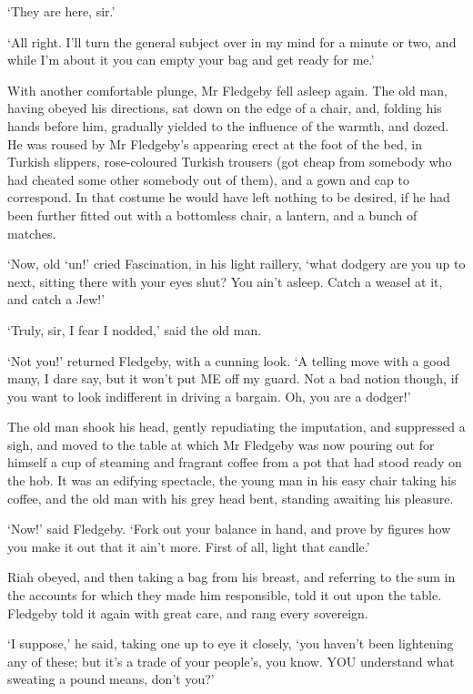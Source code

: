 ‘They are here, sir.’

‘All right. I’ll turn the general subject over in my mind for a minute
or two, and while I’m about it you can empty your bag and get ready for
me.’

With another comfortable plunge, Mr Fledgeby fell asleep again. The old
man, having obeyed his directions, sat down on the edge of a chair, and,
folding his hands before him, gradually yielded to the influence of the
warmth, and dozed. He was roused by Mr Fledgeby’s appearing erect at
the foot of the bed, in Turkish slippers, rose-coloured Turkish trousers
(got cheap from somebody who had cheated some other somebody out of
them), and a gown and cap to correspond. In that costume he would have
left nothing to be desired, if he had been further fitted out with a
bottomless chair, a lantern, and a bunch of matches.

‘Now, old ‘un!’ cried Fascination, in his light raillery, ‘what dodgery
are you up to next, sitting there with your eyes shut? You ain’t asleep.
Catch a weasel at it, and catch a Jew!’

‘Truly, sir, I fear I nodded,’ said the old man.

‘Not you!’ returned Fledgeby, with a cunning look. ‘A telling move with
a good many, I dare say, but it won’t put ME off my guard. Not a bad
notion though, if you want to look indifferent in driving a bargain. Oh,
you are a dodger!’

The old man shook his head, gently repudiating the imputation, and
suppressed a sigh, and moved to the table at which Mr Fledgeby was now
pouring out for himself a cup of steaming and fragrant coffee from a pot
that had stood ready on the hob. It was an edifying spectacle, the young
man in his easy chair taking his coffee, and the old man with his grey
head bent, standing awaiting his pleasure.

‘Now!’ said Fledgeby. ‘Fork out your balance in hand, and prove by
figures how you make it out that it ain’t more. First of all, light that
candle.’

Riah obeyed, and then taking a bag from his breast, and referring to
the sum in the accounts for which they made him responsible, told it out
upon the table. Fledgeby told it again with great care, and rang every
sovereign.

‘I suppose,’ he said, taking one up to eye it closely, ‘you haven’t been
lightening any of these; but it’s a trade of your people’s, you know.
YOU understand what sweating a pound means, don’t you?’

